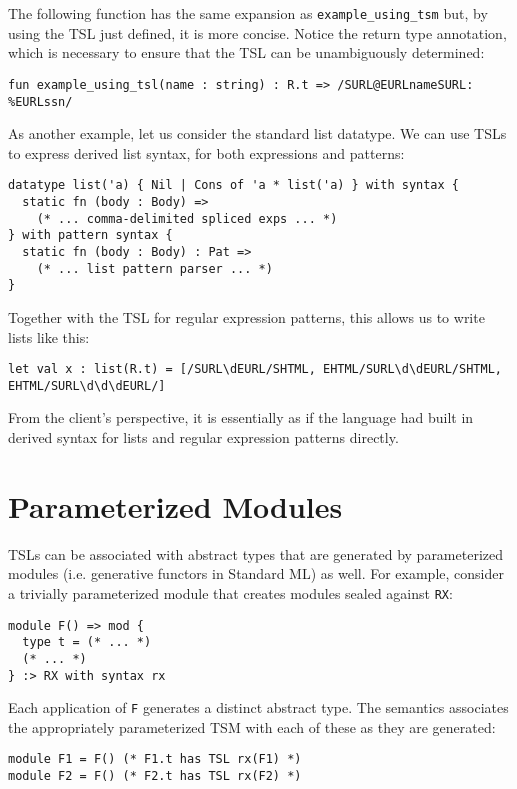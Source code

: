 The following function has the same expansion as \lstinline{example_using_tsm} but, by using the TSL just defined, it is more concise. Notice the return type annotation, which is necessary to ensure that the TSL can be unambiguously determined:
\begin{lstlisting}[numbers=none]
fun example_using_tsl(name : string) : R.t => /SURL@EURLnameSURL: %EURLssn/
\end{lstlisting}

As another example, let us consider the standard list datatype. We can use TSLs to express derived list syntax, for both expressions and patterns:
\begin{lstlisting}[numbers=none]
datatype list('a) { Nil | Cons of 'a * list('a) } with syntax {
  static fn (body : Body) => 
    (* ... comma-delimited spliced exps ... *)
} with pattern syntax {
  static fn (body : Body) : Pat => 
    (* ... list pattern parser ... *)
}
\end{lstlisting}
Together with the TSL for regular expression patterns, this allows us to write lists like this:
\begin{lstlisting}[numbers=none]
let val x : list(R.t) = [/SURL\dEURL/SHTML, EHTML/SURL\d\dEURL/SHTML, EHTML/SURL\d\d\dEURL/]
\end{lstlisting}
From the client's perspective, it is essentially as if the language had built in derived syntax for lists and regular expression patterns directly.%

\section{Parameterized Modules}
TSLs can be associated with abstract types that are generated by parameterized modules (i.e. generative functors in Standard ML) as well. For example, consider a trivially parameterized module that creates modules sealed against \lstinline{RX}:
\begin{lstlisting}[numbers=none]
module F() => mod {
  type t = (* ... *)
  (* ... *)
} :> RX with syntax rx 
\end{lstlisting}
Each application of \lstinline{F} generates a distinct abstract type. The semantics associates the appropriately parameterized TSM with each of these as they are generated:
\begin{lstlisting}[numbers=none]
module F1 = F() (* F1.t has TSL rx(F1) *)
module F2 = F() (* F2.t has TSL rx(F2) *)
\end{lstlisting}

